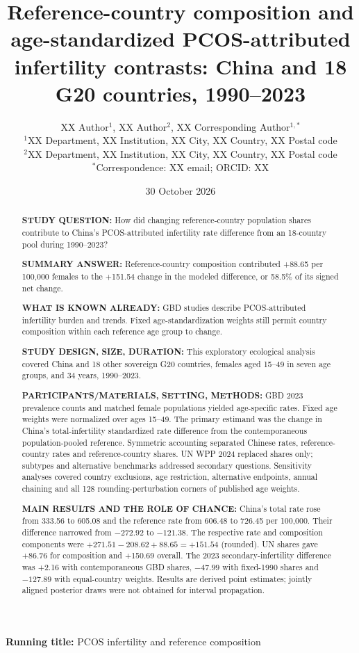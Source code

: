 \documentclass[11pt,a4paper]{article}
\title{Reference-country composition and age-standardized PCOS-attributed infertility contrasts: China and 18 G20 countries, 1990--2023}
\author{XX Author$^{1}$, XX Author$^{2}$, XX Corresponding Author$^{1,*}$\\
{\small $^{1}$XX Department, XX Institution, XX City, XX Country, XX Postal code}\\
{\small $^{2}$XX Department, XX Institution, XX City, XX Country, XX Postal code}\\
{\small $^{*}$Correspondence: XX email; ORCID: XX}}
\date{30 October 2026}
\begin{document}
\maketitle\thispagestyle{fancy}
\noindent\textbf{Running title:} PCOS infertility and reference composition

\linenumbers
\begingroup\sloppy
\begin{abstract}
\noindent\textbf{STUDY QUESTION:} How did changing reference-country population shares contribute to China's PCOS-attributed infertility rate difference from an 18-country pool during 1990--2023?

\noindent\textbf{SUMMARY ANSWER:} Reference-country composition contributed +88.65 per 100,000 females to the +151.54 change in the modeled difference, or 58.5\% of its signed net change.

\noindent\textbf{WHAT IS KNOWN ALREADY:} GBD studies describe PCOS-attributed infertility burden and trends. Fixed age-standardization weights still permit country composition within each reference age group to change.

\noindent\textbf{STUDY DESIGN, SIZE, DURATION:} This exploratory ecological analysis covered China and 18 other sovereign G20 countries, females aged 15--49 in seven age groups, and 34 years, 1990--2023.

\noindent\textbf{PARTICIPANTS/MATERIALS, SETTING, METHODS:} GBD 2023 prevalence counts and matched female populations yielded age-specific rates. Fixed age weights were normalized over ages 15--49. The primary estimand was the change in China's total-infertility standardized rate difference from the contemporaneous population-pooled reference. Symmetric accounting separated Chinese rates, reference-country rates and reference-country shares. UN WPP 2024 replaced shares only; subtypes and alternative benchmarks addressed secondary questions. Sensitivity analyses covered country exclusions, age restriction, alternative endpoints, annual chaining and all 128 rounding-perturbation corners of published age weights.

\noindent\textbf{MAIN RESULTS AND THE ROLE OF CHANCE:} China's total rate rose from 333.56 to 605.08 and the reference rate from 606.48 to 726.45 per 100,000. Their difference narrowed from $-272.92$ to $-121.38$. The respective rate and composition components were $+271.51-208.62+88.65=+151.54$ (rounded). UN shares gave +86.76 for composition and +150.69 overall. The 2023 secondary-infertility difference was +2.16 with contemporaneous GBD shares, $-47.99$ with fixed-1990 shares and $-127.89$ with equal-country weights. Results are derived point estimates; jointly aligned posterior draws were not obtained for interval propagation.


\end{abstract}
\end{document}
